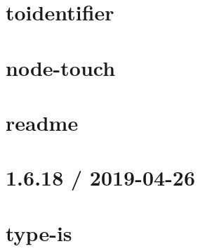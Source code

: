 \let\mypdfximage\pdfximage\def\pdfximage{\immediate\mypdfximage}\documentclass[twoside]{book}
\newcommand{\+}{\discretionary{\mbox{\scriptsize$\hookleftarrow$}}{}{}}
\begin{document}
\chapter{toidentifier}
\label{md__c_1__git_hub__p_r_o_y_e_c_t_o-_i_i_i-_g_o_t_rest-api_node_modules_toidentifier__r_e_a_d_m_e}

\chapter{node-\/touch}
\label{md__c_1__git_hub__p_r_o_y_e_c_t_o-_i_i_i-_g_o_t_rest-api_node_modules_touch__r_e_a_d_m_e}

\chapter{readme}
\label{md__c_1__git_hub__p_r_o_y_e_c_t_o-_i_i_i-_g_o_t_rest-api_node_modules_type-fest_readme}

\chapter{1.6.18 / 2019-\/04-\/26}
\label{md__c_1__git_hub__p_r_o_y_e_c_t_o-_i_i_i-_g_o_t_rest-api_node_modules_type-is__h_i_s_t_o_r_y}

\chapter{type-\/is}
\label{md__c_1__git_hub__p_r_o_y_e_c_t_o-_i_i_i-_g_o_t_rest-api_node_modules_type-is__r_e_a_d_m_e}

\end{document}
